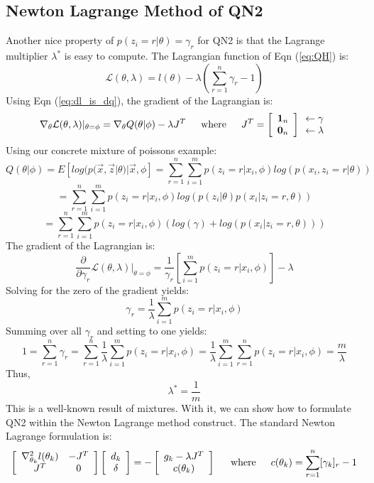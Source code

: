 \documentclass[letter,12pt]{article}
\begin{document}
\subsection{Newton Lagrange Method of QN2}

Another nice property of $p(z_i=r|\theta)=\gamma_r$ for QN2 is that the Lagrange multiplier $\lambda^*$ is easy to compute.  The Lagrangian function of Eqn (\ref{eq:QH}) is:
\[
\mathcal{L}(\theta,\lambda) = l(\theta) - \lambda(\sum_{r=1}^{n}\gamma_r - 1)
\]
Using Eqn (\ref{eq:dl_is_dq}), the gradient of the Lagrangian is:
\[
\nabla_{\theta}\mathcal{L}(\theta,\lambda)|_{\theta=\phi}
= \nabla_{\theta}Q(\theta|\phi) - \lambda J^T
\indent
\text{where}
\indent
J^T =
\left[
\begin{array}{c}
\boldsymbol{1}_n
\\
\boldsymbol{0}_n
\end{array}
\right]
\begin{array}{c}
\leftarrow\gamma
\\
\leftarrow\lambda
\end{array}
\]
Using our concrete mixture of poissons example:
\[
Q(\theta|\phi) = E[log(p(\vec{x},\vec{z}|\theta)|\vec{x},\phi]
=
\sum_{r=1}^{n}\sum_{i=1}^{m}p(z_i=r|x_i,\phi)log(p(x_i,z_i=r|\theta))
\]
\[
=\sum_{r=1}^{n}\sum_{i=1}^{m}p(z_i=r|x_i,\phi)
log(p(z_i|\theta)p(x_i|z_i=r,\theta))
\]
\[
=\sum_{r=1}^{n}\sum_{i=1}^{m}p(z_i=r|x_i,\phi)
\left(
log(\gamma) + log(p(x_i|z_i=r,\theta))\right)
\]
The gradient of the Lagrangian is:
\[
\frac{\partial}{\partial \gamma_r}\mathcal{L}(\theta,\lambda)|_{\theta=\phi}
=
\frac{1}{\gamma_r}\left[\sum_{i=1}^{m}p(z_i=r|x_i,\phi)
\right]-\lambda
\]
Solving for the zero of the gradient yields:
\[
\gamma_r
=
\frac{1}{\lambda}\sum_{i=1}^{m}p(z_i=r|x_i,\phi)
\]
Summing over all $\gamma_r$ and setting to one yields:
\[
1 = \sum_{r=1}^{n}\gamma_r = 
\sum_{r=1}^{n}\frac{1}{\lambda}\sum_{i=1}^{m}p(z_i=r|x_i,\phi)
=
\frac{1}{\lambda}\sum_{i=1}^{m}\sum_{r=1}^{n}p(z_i=r|x_i,\phi)
= \frac{m}{\lambda}
\]
Thus,
\[
\lambda^* = \frac{1}{m}
\]
This is a well-known result of mixtures.  With it, we can show how to formulate QN2 within the Newton Lagrange method construct. The standard Newton Lagrange formulation is:
\[
\left[
\begin{array}{cc}
\nabla^2_{\theta_k}l(\theta_k) & -J^T
\\
J^T & 0
\end{array}
\right]
\left[
\begin{array}{cc}
d_k
\\
\delta
\end{array}
\right]
=
-
\left[
\begin{array}{c}
g_k - \lambda J^T
\\
c(\theta_k)
\end{array}
\right]
\indent
\text{where}
\indent
c(\theta_k) = \sum_{r=1}^{n}[\gamma_k]_r - 1
\]
\end{document}
